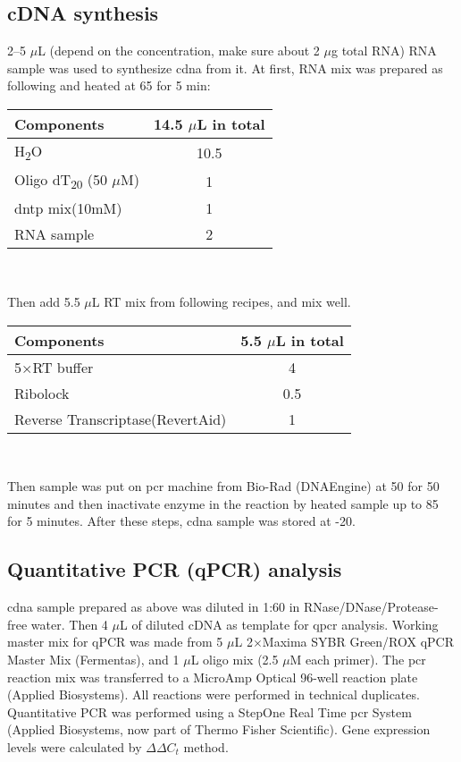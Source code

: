 \subsection{cDNA synthesis}
2--5 $\mu$L (depend on the concentration, make sure about 2 $\mu$g total RNA) RNA sample was used to synthesize \gls{cdna} from it. At first, RNA mix was prepared as following and heated at 65{\celsius} for 5 min:

\begin{center}
	\begin{tabular}{l | c}
	Components                   & 14.5 $\mu$L in total\\
	\hline
	H\textsubscript{2}O          & 10.5\\
	Oligo dT\textsubscript{20} (50 $\mu$M)  & 1\\
	\gls{dntp} mix(10mM)               & 1\\
	RNA sample                   & 2\\
	\end{tabular}\\
\end{center}

Then add 5.5 $\mu$L RT mix from following recipes, and mix well.

\begin{center}
	\begin{tabular}{l | c}
	Components                           & 5.5 $\mu$L in total\\
	\hline
	5$\times$RT buffer                         & 4\\
	Ribolock                             & 0.5\\
	Reverse Transcriptase(RevertAid)     & 1\\
	\end{tabular}\\
\end{center}

Then sample was put on \gls{pcr} machine from Bio-Rad (DNAEngine) at 50{\celsius} for 50 minutes and then inactivate enzyme in the reaction by heated sample up to 85{\celsius} for 5 minutes. After these steps, \gls{cdna} sample was stored at -20{\celsius}.

\subsection{Quantitative PCR (qPCR) analysis}
\gls{cdna} sample prepared as above was diluted in 1:60 in RNase/DNase/Protease-free water. Then 4 $\mu$L of diluted cDNA as template for \gls{qpcr} analysis. Working master mix for qPCR was made from 5 $\mu$L 2$\times$Maxima SYBR Green/ROX qPCR Master Mix (Fermentas), and 1 $\mu$L oligo mix (2.5 $\mu$M each primer). The \gls{pcr} reaction mix was transferred to a MicroAmp{\texttrademark} Optical 96-well reaction plate (Applied Biosystems). All reactions were performed in technical duplicates. Quantitative PCR was performed using a StepOne Real Time \gls{pcr} System (Applied Biosystems, now part of Thermo Fisher Scientific). Gene expression levels were calculated by $\Delta \Delta C_t$ method.

